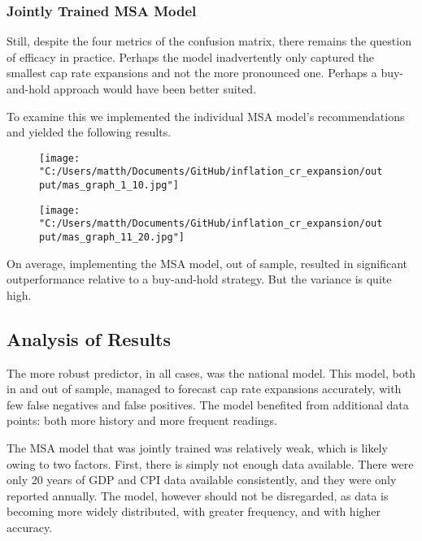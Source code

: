 \subsubsection{Jointly Trained MSA Model}


Still, despite the four metrics of the confusion matrix, there remains the question of efficacy in practice. Perhaps the model inadvertently only captured the smallest cap rate expansions and not the more pronounced one. Perhaps a buy-and-hold approach would have been better suited. 

To examine this we implemented the individual MSA model's recommendations and yielded the following results.

\begin{figure}
\hspace*{-0.25in}
\texttt{[image: "C:/Users/matth/Documents/GitHub/inflation\_cr\_expansion/output/mas\_graph\_1\_10.jpg"]}
\end{figure}

\begin{figure}
\hspace*{-0.25in}
\texttt{[image: "C:/Users/matth/Documents/GitHub/inflation\_cr\_expansion/output/mas\_graph\_11\_20.jpg"]}
\end{figure}

On average, implementing the MSA model, out of sample, resulted in significant outperformance relative to a buy-and-hold strategy. But the variance is quite high. 

\subsection{Analysis of Results}

The more robust predictor, in all cases, was the national model. This model, both in and out of sample, managed to forecast cap rate expansions accurately, with few false negatives and false positives. The model benefited from additional data points: both more history and more frequent readings. 

The MSA model that was jointly trained was relatively weak, which is likely owing to two factors. First, there is simply not enough data available. There were only 20 years of GDP and CPI data available consistently, and they were only reported annually. The model, however should not be disregarded, as data is becoming more widely distributed, with greater frequency, and with higher accuracy.

